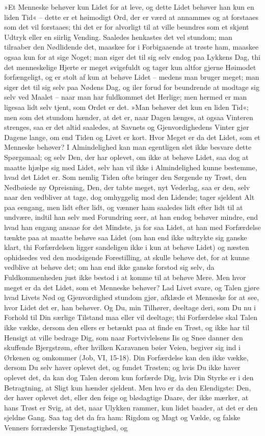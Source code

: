 \documentclass[12pt,a4paper]{article}
\begin{document}
»Et Menneske behøver kun Lidet for at leve, og dette Lidet behøver han kun en liden Tid« – dette er et høimodigt Ord, der er værd at annammes og at forstaaes som det vil forstaaes; thi det er for alvorligt til at ville beundres som et skjønt Udtryk eller en siirlig Vending. Saaledes henkastes det vel stundom; man tilraaber den Nødlidende det, maaskee for i Forbigaaende at trøste ham, maaskee ogsaa kun for at sige Noget; man siger det til sig selv endog paa Lykkens Dag, thi det menneskelige Hjerte er meget svigefuldt og tager kun altfor gjerne Høimodet forfængeligt, og er stolt af kun at behøve Lidet – medens man bruger meget; man siger det til sig selv paa Nødens Dag, og iler forud for beundrende at modtage sig selv ved Maalet – naar man har fuldkommet det Herlige; men hermed er man ligesaa lidt selv tjent, som Ordet er det. »Man behøver det kun en liden Tid«; men som det stundom hænder, at det er, naar Dagen længes, at ogsaa Vinteren strenges, saa er det altid saaledes, at Savnets og Gjenvordighedens Vinter gjør Dagene lange, om end Tiden og Livet er kort. Hvor Meget er da det Lidet, som et Menneske behøver? I Almindelighed kan man egentligen slet ikke besvare dette Spørgsmaal; og selv Den, der har oplevet, om ikke at behøve Lidet, saa dog at maatte hjælpe sig med Lidet, selv han vil ikke i Almindelighed kunne bestemme, hvad det Lidet er. Som nemlig Tiden ofte bringer den Sørgende ny Trøst, den Nedbøiede ny Opreisning, Den, der tabte meget, nyt Vederlag, saa er den, selv naar den vedbliver at tage, dog omhyggelig mod den Lidende; tager sjeldent Alt paa eengang, men lidt efter lidt, og vænner ham saaledes lidt efter lidt til at undvære, indtil han selv med Forundring seer, at han endog behøver mindre, end hvad han engang ansaae for det Mindste, ja for saa Lidet, at han med Forfærdelse tænkte paa at maatte behøve saa Lidet (om han end ikke udtrykte sig ganske klart, thi Forfærdelsen ligger sandeligen ikke i kun at behøve Lidet) og næsten ophidsedes ved den modsigende Forestilling, at skulle behøve det, for at kunne vedblive at behøve det; om han end ikke ganske forstod sig selv, da Fuldkommenheden just ikke bestod i at komme til at behøve Mere. Men hvor meget er da det Lidet, som et Menneske behøver? Lad Livet svare, og Talen gjøre hvad Livets Nød og Gjenvordighed stundom gjør, afklæde et Menneske for at see, hvor Lidet det er, han behøver. Og Du, min Tilhører, deeltage deri, som Du nu i Forhold til Din særlige Tilstand maa eller vil deeltage; thi Forfærdelse skal Talen ikke vække, dersom den ellers er betænkt paa at finde en Trøst, og ikke har til Hensigt at ville bedrage Dig, som naar Fortvivlelsens Iis og Snee danner den skuffende Bjergstrøm, efter hvilken Karavanen bøier Veien, begiver sig ind i Ørkenen og omkommer (Job, VI, 15-18). Din Forfærdelse kan den ikke vække, dersom Du selv haver oplevet det, og fundet Trøsten; og hvis Du ikke haver oplevet det, da kan dog Talen derom kun forfærde Dig, hvis Din Styrke er i den Betragtning, at Sligt kun hænder sjeldent. Men hvo er da den Elendigste: Den, der haver oplevet det, eller den feige og blødagtige Daare, der ikke mærker, at hans Trøst er Svig, at det, naar Ulykken rammer, kun lidet baader, at det er den sjeldne Gang. Saa tag det da fra ham: Rigdom og Magt og Vælde, og falske Venners forræderske Tjenstagtighed, og 
\end{document}
